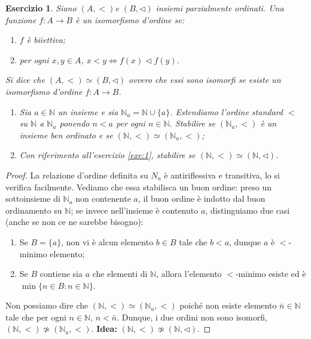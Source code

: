 \documentclass[fontsize = 11 pt, paper=A4, oneside, index=totoc, hyperref]{article}
\theoremstyle{definition}
\theoremstyle{plain}
\newtheorem{exe}{Esercizio}[section]
\newcommand{\N}{\mathbb{N}}
\begin{document}
\begin{exe}
  Siano \((A,<)\)e \((B,\lhd)\) insiemi parzialmente ordinati. Una funzione \(f \colon A \to B\) è un \emph{isomorfismo d'ordine} se:
  \begin{enumerate}
    \item \(f\) è biiettiva;
    \item per ogni \(x,y \in A\), \(x < y \iff f(x) \lhd f(y)\).
  \end{enumerate}
  Si dice che \((A,<) \simeq (B, \lhd)\) ovvero che essi sono isomorfi se esiste un isomorfismo d'ordine \(f \colon A \to B\).
  \begin{enumerate}
    \item Sia \(a \in \N\) un insieme e sia \(\N_a = \N \cup \lbrace a \rbrace\). Estendiamo l'ordine standard \(<\) su \(\N\) a \(\N_a\) ponendo \(n < a\) per ogni \(n \in \N\). Stabilire se \((\N_a,<)\) è un insieme ben ordinato e se \((\N,<) \simeq (\N_a,<)\);
    \item Con riferimento all'esercizio \ref{exe:1}, stabilire se \((\N,<)\simeq(\N,\lhd)\).
  \end{enumerate}
\end{exe}
\begin{proof}
  La relazione d'ordine definita su \(N_a\) è antiriflessiva e transitiva, lo si verifica facilmente. Vediamo che essa stabilisca un buon ordine: preso un sottoinsieme di \(\N_a\) non contenente \(a\), il buon ordine è indotto dal buon ordinamento su \(\N\); se invece nell'insieme è contenuto \(a\), distinguiamo due casi (anche se non ce ne sarebbe bisogno):
  \begin{enumerate}
    \item Se \(B = \lbrace a \rbrace\), non vi è alcun elemento \(b \in B\) tale che \(b < a\), dunque \(a\) è \(<\)-minimo elemento;
    \item Se \(B\) contiene sia \(a\) che elementi di \(\N\), allora l'elemento \(<\)-minimo esiste ed è \(\min \lbrace n \in B \colon n \in \N \rbrace\).
  \end{enumerate}
  Non possiamo dire che \((\N,<)\simeq(\N_a,<)\) poiché non esiste elemento \(\bar{n} \in \N\) tale che per ogni \(n \in \N\), \(n < \bar{n}\). Dunque, i due ordini non sono isomorfi, \((\N,<) \not\simeq(\N_a,<)\).
  {\bf Idea:} \((\N,<) \not\simeq (\N, \lhd)\).
\end{proof}
\end{document}
